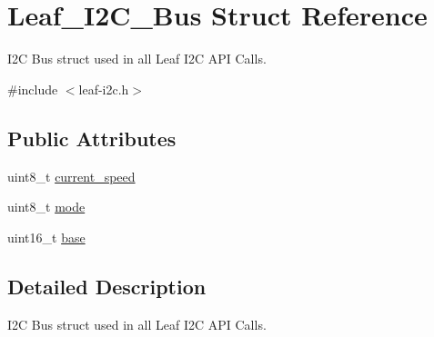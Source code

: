 \hypertarget{structLeaf__I2C__Bus}{\section{Leaf\-\_\-\-I2\-C\-\_\-\-Bus Struct Reference}
\label{structLeaf__I2C__Bus}
}


I2\-C Bus struct used in all Leaf I2\-C A\-P\-I Calls.  




{\ttfamily \#include $<$leaf-\/i2c.\-h$>$}

\subsection*{Public Attributes}
\begin{DoxyCompactItemize}
\item 
uint8\-\_\-t \hyperlink{structLeaf__I2C__Bus_a18b52797d914609d770b8942a447487d}{current\-\_\-speed}
\item 
uint8\-\_\-t \hyperlink{structLeaf__I2C__Bus_a19a3888b5a4c0342d05fe0de36bc62bc}{mode}
\item 
uint16\-\_\-t \hyperlink{structLeaf__I2C__Bus_a828e3bef566a5f9b7dc02d6e6788e1b9}{base}
\end{DoxyCompactItemize}


\subsection{Detailed Description}
I2\-C Bus struct used in all Leaf I2\-C A\-P\-I Calls. 

